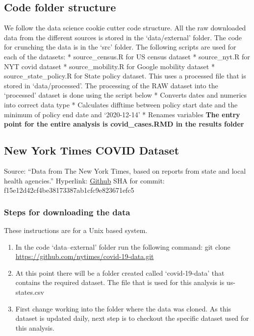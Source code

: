 \documentclass[
]{article}
\begin{document}
\hypertarget{code-folder-structure}{%
\subsection{Code folder structure}\label{code-folder-structure}}

We follow the data science cookie cutter code structure. All the raw
downloaded data from the different sources is stored in the
`data/external' folder. The code for crunching the data is in the `src'
folder. The following scripts are used for each of the datasets: *
source\_census.R for US census dataset * source\_nyt.R for NYT covid
dataset * source\_mobility.R for Google mobility dataset *
source\_state\_policy.R for State policy dataset. This uses a processed
file that is stored in `data/processed'. The processing of the RAW
dataset into the `processed' dataset is done using the script below *
Converts dates and numerics into correct data type * Calculates difftime
between policy start date and the minimum of policy end date and
`2020-12-14' * Renames variables \textbf{The entry point for the entire
analysis is covid\_cases.RMD in the results folder}

\hypertarget{new-york-times-covid-dataset-1}{%
\subsection{New York Times COVID
Dataset}\label{new-york-times-covid-dataset-1}}

Source: ``Data from The New York Times, based on reports from state and
local health agencies.'' Hyperlink:
\href{https://github.com/nytimes/covid-19-data}{Github} SHA for commit:
f15e12d42cf4be38173387ab1cfc9e823671efc5

\hypertarget{steps-for-downloading-the-data}{%
\subsubsection{Steps for downloading the
data}\label{steps-for-downloading-the-data}}

These instructions are for a Unix based system.

\begin{enumerate}
\def\labelenumi{\arabic{enumi}.}
\item
  In the code `data--external' folder run the following command: git
  clone \url{https://github.com/nytimes/covid-19-data.git}
\item
  At this point there will be a folder created called `covid-19-data'
  that contains the required dataset. The file that is used for this
  analysis is us-states.csv
\item
  First change working into the folder where the data was cloned. As
  this dataset is updated daily, next step is to checkout the specific
  dataset used for this analysis.
\end{enumerate}
\end{document}
